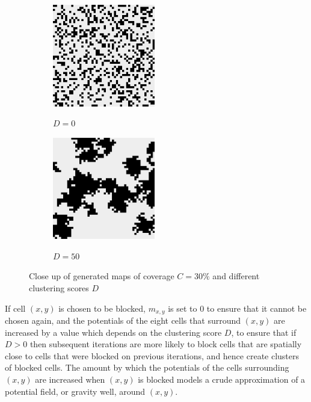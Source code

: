 \documentclass[12pt,notitlepage]{report}
\begin{document}
\begin{figure}
\centering
  \begin{subfigure}{.49\textwidth}
  \centering
  {\includegraphics[width=0.49\textwidth]{clustering0_.png}}
  \caption{$D=0$}
  \end{subfigure}
  \begin{subfigure}{.49\textwidth}
  \centering
  {\includegraphics[width=0.49\textwidth]{clustering50_.png}}
  \caption{$D=50$}
  \end{subfigure}
  \caption[Close up of generated maps]{Close up of generated maps of coverage $C=30\%$ and different clustering scores $D$} 
\end{figure}

\noindent
If cell $(x,y)$ is chosen to be blocked, $m_{x,y}$ is set to $0$ to ensure that it cannot be chosen again, and the potentials of the eight cells that surround $(x,y)$ are increased by a value which depends on the clustering score $D$, to ensure that if $D > 0$ then subsequent iterations are more likely to block cells that are spatially close to cells that were blocked on previous iterations, and hence create clusters of blocked cells. The amount by which the potentials of the cells surrounding $(x,y)$ are increased when $(x,y)$ is blocked models a crude approximation of a potential field, or gravity well, around $(x,y)$.\\
\end{document}
